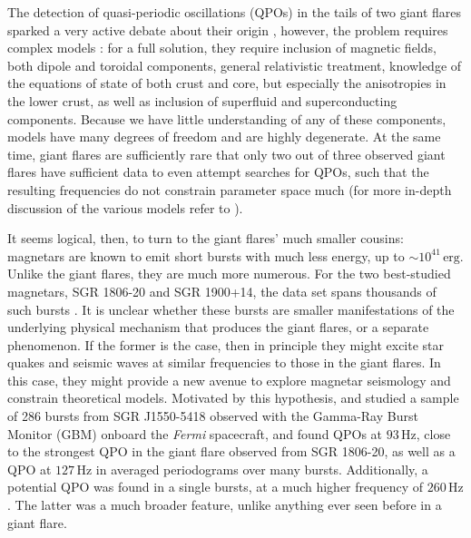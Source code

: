 \documentclass[numberedappendix]{emulateapj}
\newcommand{\hz}{\,\mathrm{Hz}}
\begin{document}
The detection of quasi-periodic oscillations (QPOs) in the tails of two giant flares sparked a very active debate about their origin \citep{israel2005,strohmayer2005,strohmayer2006,watts2006}, however, the problem requires complex models \citep[for a general discussion, see ][]{watts2011}: for a full solution, they require inclusion of magnetic fields, both dipole and toroidal components, general relativistic treatment, knowledge of the equations of state of both crust and core, but especially the anisotropies in the lower crust, as well as inclusion of superfluid and superconducting components. Because we have little understanding of any of these components, models have many degrees of freedom and are highly degenerate. At the same time, giant flares are sufficiently rare that only two out of three observed giant flares have sufficient data to even attempt searches for QPOs, such that the resulting frequencies do not constrain parameter space much (for more in-depth discussion of the various models refer to \citealp{samuelsson2007,andersson2009,sotani2007,sotani2008,vanhoven2008,vanhoven2011,vanhoven2012,colaiuda2011,colaiuda2012,gabler2011,gabler2012,gabler2013,passamonti2013a,passamonti2013b,lander2010,lander2011,glampedakis2006,glampedakis2014}).

It seems logical, then, to turn to the giant flares' much smaller cousins: magnetars are known to emit short bursts with much less energy, up to $\sim 10^{41} \, \mathrm{erg}$. Unlike the giant flares, they are much more numerous. For the two best-studied magnetars, SGR 1806-20 and SGR 1900+14, the data set spans thousands of such bursts \citep[e.g.][]{gogus1999,gogus2000,prieskorn2012}. It is unclear whether these bursts are smaller manifestations of the underlying physical mechanism that produces the giant flares, or a separate phenomenon. If the former is the case, then in principle they might excite star quakes and seismic waves at similar frequencies to those in the giant flares. In this case, they might provide a new avenue to explore magnetar seismology and constrain theoretical models. Motivated by this hypothesis, \citet{huppenkothen2013} and \citet{huppenkothen2014} studied a sample of 286 bursts from SGR J1550-5418 observed with the Gamma-Ray Burst Monitor (GBM) onboard the {\it Fermi} spacecraft, and found QPOs at $93 \hz$, close to the strongest QPO in the giant flare observed from SGR 1806-20, as well as a QPO at $127\hz$ in averaged periodograms over many bursts. Additionally, a potential QPO was found in a single bursts, at a much higher frequency of $260 \hz$. The latter was a much broader feature, unlike anything ever seen before in a giant flare.
\end{document}

